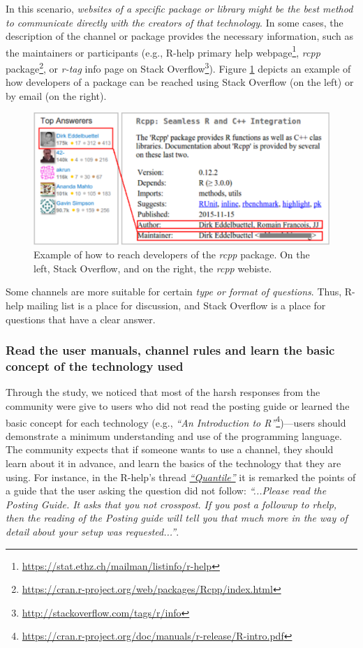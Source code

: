     In this scenario, \emph{websites of a specific package or library might be the best method to communicate directly with the creators of that technology}.
    In some cases, the description of the channel or package provides the necessary information, such as the maintainers or participants (e.g., R-help primary help webpage\footnote{\url{https://stat.ethz.ch/mailman/listinfo/r-help}}, \emph{rcpp} package\footnote{\url{https://cran.r-project.org/web/packages/Rcpp/index.html}}, or \textit{r-tag} info page on Stack Overflow\footnote{\url{http://stackoverflow.com/tags/r/info}}).
    Figure \ref{fig:CCchannel} depicts an example of how developers of a package can be reached using Stack Overflow (on the left) or by email (on the right). 

    \begin{figure} [!htb]
        \centering
        \includegraphics[width=\columnwidth]{Figures/CCchannel}
        \caption{Example of how to reach developers of the \emph{rcpp} package. On the left, Stack Overflow, and on the right, the \emph{rcpp} webiste.}
        \label{fig:CCchannel}
    \end{figure}

    Some channels are more suitable for certain \emph{type or format of questions}. 
    Thus, R-help mailing list is a place for discussion, and Stack Overflow is a place for questions that have a clear answer.


\subsubsection{Read the user manuals, channel rules and learn the basic concept of the technology used}

    Through the study, we noticed that most of the harsh responses from the community were give to users who did not read the posting guide or learned the basic concept for each technology (e.g., \textit{``An Introduction to R''}\footnote{\url{https://cran.r-project.org/doc/manuals/r-release/R-intro.pdf}})---users should demonstrate a minimum understanding and use of the programming language.
    The community expects that if someone wants to use a channel, they should learn about it in advance, and learn the basics of the technology that they are using.
    For instance, in the R-help's thread \textit{\href{http://goo.gl/Dc8gXw}{``Quantile''}} it is remarked the points of a guide that the user asking the question did not follow: \textit{``...Please read the Posting Guide. It asks that you not crosspost. If you post a followup to rhelp, then the reading of the Posting guide will tell you that much more in the way of detail about your setup was requested...''}.

